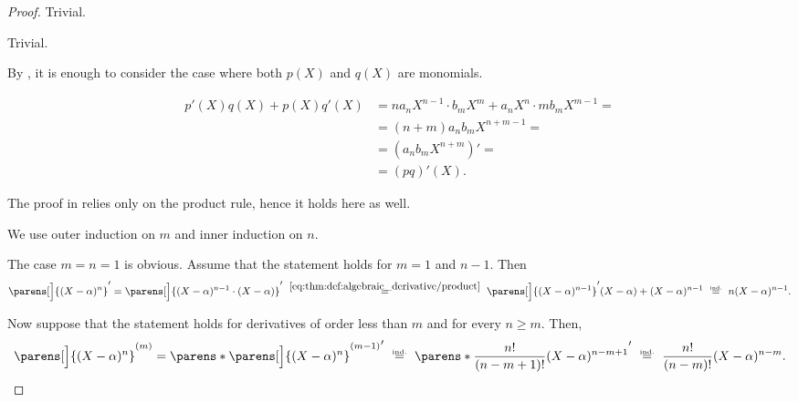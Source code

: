 \begin{proof}
   Trivial.

   Trivial.

   By , it is enough to consider the case where both \( p(X) \) and \( q(X) \) are monomials.

  \begin{align*}
    p'(X) q(X) + p(X) q'(X)
    &=
    n a_n X^{n-1} \cdot b_m X^m + a_n X^n \cdot m b_m X^{m-1}
    = \\ &=
    (n + m) a_n b_m X^{n+m-1}
    = \\ &=
    (a_n b_m X^{n+m})'
    = \\ &=
    (pq)'(X).
  \end{align*}

   The proof in  relies only on the product rule, hence it holds here as well.

   We use outer induction on \( m \) and inner induction on \( n \).

  The case \( m = n = 1 \) is obvious. Assume that the statement holds for \( m = 1 \) and \( n - 1 \). Then
  \begin{equation*}
    \parens[\Big]{ (X - \alpha)^n }'
    =
    \parens[\Big]{ (X - \alpha)^{n-1} \cdot (X - \alpha) }'
    \reloset {\eqref{eq:thm:def:algebraic_derivative/product}} =
    \parens[\Big]{ (X - \alpha)^{n-1} }' (X - \alpha) + (X - \alpha)^{n-1}
    \reloset {\T{ind.}} =
    n (X - \alpha)^{n-1}.
  \end{equation*}

  Now suppose that the statement holds for derivatives of order less than \( m \) and for every \( n \geq m \). Then,
  \begin{equation*}
    \parens[\Big]{ (X - \alpha)^n }^{(m)}
    =
    \parens*{\parens[\Big]{ (X - \alpha)^n }^{(m-1)}}'
    \reloset {\T{ind.}} =
    \parens*{ \frac {n!} {(n - m + 1)!} (X - \alpha)^{n - m + 1} }'
    \reloset {\T{ind.}} =
    \frac {n!} {(n - m)!} (X - \alpha)^{n - m}.
  \end{equation*}
\end{proof}

